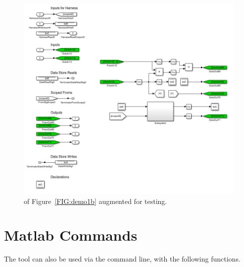 \documentclass{article}
\begin{document}
\begin{figure}[ht!]
	\centering
	\includegraphics[width=\textwidth]{../figs/Demo5}
	\caption{ of Figure~\ref{FIG:demo1b} augmented for testing.}
	\label{FIG:demo5}
\end{figure}

\clearpage
\section{Matlab Commands}

The tool can also be used via the \matlab command line, with the following functions.
\end{document}
